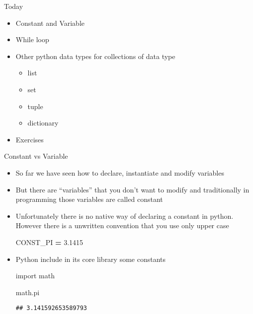 \documentclass[
  8pt,
  ignorenonframetext,
]{beamer}
\newenvironment{Shaded}{\begin{snugshade}}{\end{snugshade}}
\newcommand{\FloatTok}[1]{\textcolor[rgb]{0.00,0.00,0.81}{#1}}
\newcommand{\ImportTok}[1]{#1}
\newcommand{\NormalTok}[1]{#1}
\newcommand{\OperatorTok}[1]{\textcolor[rgb]{0.81,0.36,0.00}{\textbf{#1}}}
\providecommand{\tightlist}{%
  \setlength{\itemsep}{0pt}\setlength{\parskip}{0pt}}
\begin{document}
\begin{frame}{Today}
\protect\hypertarget{today}{}
\begin{itemize}
\item
  Constant and Variable
\item
  While loop
\item
  Other python data types for collections of data type

  \begin{itemize}
  \item
    list
  \item
    set
  \item
    tuple
  \item
    dictionary
  \end{itemize}
\item
  Exercises
\end{itemize}
\end{frame}

\begin{frame}[fragile]{Constant vs Variable}
\protect\hypertarget{constant-vs-variable}{}
\begin{itemize}[<+->]
\tightlist
\item
  So far we have seen how to declare, instantiate and modify variables
\end{itemize}

\begin{itemize}[<+->]
\tightlist
\item
  But there are ``variables'' that you don't want to modify and
  traditionally in programming those variables are called constant
\end{itemize}

\begin{itemize}[<+->]
\item
  Unfortunately there is no native way of declaring a constant in
  python. However there is a unwritten convention that you use only
  upper case

\begin{Shaded}
\begin{Highlighting}[]
\NormalTok{CONST\_PI }\OperatorTok{=} \FloatTok{3.1415}
\end{Highlighting}
\end{Shaded}
\end{itemize}

\begin{itemize}[<+->]
\item
  Python include in its core library some constants

\begin{Shaded}
\begin{Highlighting}[]
\ImportTok{import}\NormalTok{ math}

\NormalTok{math.pi}
\end{Highlighting}
\end{Shaded}

\begin{verbatim}
## 3.141592653589793
\end{verbatim}
\end{itemize}
\end{frame}
\end{document}
